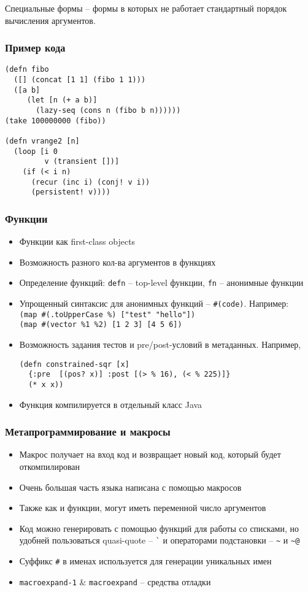 \documentclass[ignorenonframetext]{beamer}
\begin{document}
Специальные формы -- формы в которых не работает стандартный порядок вычисления аргументов.

\begin{frame}
  \frametitle{Пример кода}
\begin{lstlisting}
(defn fibo
  ([] (concat [1 1] (fibo 1 1)))
  ([a b]
     (let [n (+ a b)]
       (lazy-seq (cons n (fibo b n))))))
(take 100000000 (fibo))

(defn vrange2 [n]
  (loop [i 0 
         v (transient [])]
    (if (< i n)
      (recur (inc i) (conj! v i))
      (persistent! v))))
\end{lstlisting}
\end{frame}

\begin{frame}[t,fragile]
  \frametitle{Функции}
  \begin{itemize}
  \item Функции как first-class objects
  \item Возможность разного кол-ва аргументов в функциях %
  \item Определение функций: \lstinline!defn! -- top-level функции, \lstinline!fn! --
    анонимные функции
  \item Упрощенный синтаксис для анонимных функций -- \lstinline!#(code)!. Например:\\
    \lstinline!(map #(.toUpperCase %) ["test" "hello"])!\\
    \lstinline!(map #(vector %1 %2) [1 2 3] [4 5 6])!
  \item Возможность задания тестов и pre/post-условий в метаданных. Например,
\begin{lstlisting}
(defn constrained-sqr [x]
  {:pre  [(pos? x)] :post [(> % 16), (< % 225)]}
  (* x x))
\end{lstlisting}
  \item Функция компилируется в отдельный класс Java
  \end{itemize}
\end{frame}

\begin{frame}[t,fragile]
  \frametitle{Метапрограммирование и макросы}
  \begin{itemize}
  \item Макрос получает на вход код и возвращает новый код, который будет откомпилирован
  \item Очень большая часть языка написана с помощью макросов
  \item Также как и функции, могут иметь переменной число аргументов
  \item Код можно генерировать с помощью функций для работы со списками, но удобней
    пользоваться quasi-quote -- \lstinline!`! и операторами подстановки -- \lstinline!~! и
    \lstinline!~@! %
  \item Суффикс \lstinline!#! в именах используется для генерации уникальных имен
  \item \texttt{macroexpand-1} \& \texttt{macroexpand} -- средства отладки
  \end{itemize}
\end{frame}
\end{document}
